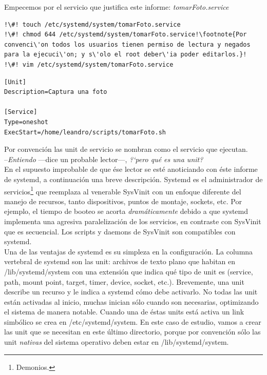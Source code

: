 \documentclass[10pt,a4paper]{article}
\begin{document}
Empecemos por el servicio que justifica este informe: \emph{tomarFoto.service}\\

\begin{lstlisting}
!\#! touch /etc/systemd/system/tomarFoto.service
!\#! chmod 644 /etc/systemd/system/tomarFoto.service!\footnote{Por convenci\'on todos los usuarios tienen permiso de lectura y negados para la ejecuci\'on; y s\'olo el root deber\'ia poder editarlos.}!
!\#! vim /etc/systemd/system/tomarFoto.service
\end{lstlisting}

\begin{scriptsize}
\begin{mdframed}
\begin{verbatim}
[Unit]
Description=Captura una foto

[Service]
Type=oneshot
ExecStart=/home/leandro/scripts/tomarFoto.sh
\end{verbatim}
\end{mdframed}
\end{scriptsize}

Por convenci\'on las unit de servicio se nombran como el servicio que ejecutan.\\

--\emph{Entiendo} ---dice un probable lector---, \emph{?`pero qu\'e es una \emph{unit}?}\\

En el supuesto improbable de que \'ese lector se est\'e anoticiando con \'este informe de systemd, a continuaci\'on una breve descripci\'on. Systemd es el administrador de servicios\footnote{Demonios.} que reemplaza al venerable SysVinit con un enfoque diferente del manejo de recursos, tanto dispositivos, puntos de montaje, sockets, etc. Por ejemplo, el tiempo de booteo se acorta \emph{dram\'aticamente} debido a que systemd implementa una agresiva paralelizaci\'on de los servicios, en contraste con SysVinit que es secuencial. Los scripts y daemons de SysVinit son compatibles con systemd.\\

Una de las ventajas de systemd es su simpleza en la configuraci\'on. La columna vertebral de systemd son las unit: archivos de texto plano que habitan en /lib/systemd/system con una extensi\'on que indica qu\'e tipo de unit es (service, path, mount point, target, timer, device, socket, etc.). Brevemente, una unit describe un recurso y le indica a systemd c\'omo debe activarlo. No todas las unit est\'an activadas al inicio, muchas inician s\'olo cuando son necesarias, optimizando el sistema de manera notable. Cuando una de \'estas units est\'a activa un link simb\'olico se crea en /etc/systemd/system. En este caso de estudio, vamos a crear las unit que se necesitan en este \'ultimo directorio, porque por convenci\'on s\'olo las unit \emph{nativas} del sistema operativo deben estar en /lib/systemd/system.\\
\end{document}
